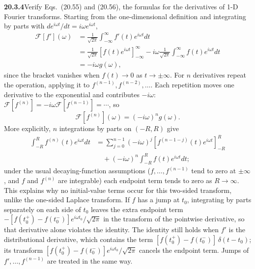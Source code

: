\par\bigskip
\noindent\textbf{20.3.4}\quad Verify Eqs.~(20.55) and (20.56), the
formulas for the derivatives of 1-D Fourier transforms.
\solution
Starting from the one-dimensional definition and integrating by
parts with $de^{i\omega t}/dt=i\omega e^{i\omega t}$,
\begin{align*}
\mathcal F[f'](\omega)
&=\frac1{\sqrt{2\pi}}\int_{-\infty}^{\infty}f'(t)e^{i\omega t}dt\\
&=\frac1{\sqrt{2\pi}}[f(t)e^{i\omega t}]_{-\infty}^{\infty}
-i\omega\frac1{\sqrt{2\pi}}\int_{-\infty}^{\infty}f(t)e^{i\omega t}dt\\
&=-i\omega g(\omega),
\end{align*}
since the bracket vanishes when $f(t)\to0$ as $t\to\pm\infty$.
For $n$ derivatives repeat the operation, applying it to
$f^{(n-1)},f^{(n-2)},\ldots$. Each repetition moves
one derivative to the exponential and contributes $-i\omega$:
$\mathcal F[f^{(n)}]=-i\omega\mathcal F[f^{(n-1)}]=\cdots$, so
\[
\boxed{\mathcal F[f^{(n)}](\omega)=(-i\omega)^n g(\omega)}.
\]
More explicitly, $n$ integrations by parts on $(-R,R)$ give
\begin{align*}
\int_{-R}^{R}f^{(n)}(t)e^{i\omega t}dt
&=\sum_{j=0}^{n-1}(-i\omega)^j
[f^{(n-1-j)}(t)e^{i\omega t}]_{-R}^{R}\\
&\quad+(-i\omega)^n\int_{-R}^{R}f(t)e^{i\omega t}dt;
\end{align*}
under the usual decaying-function assumptions ($f,\ldots,f^{(n-1)}$
tend to zero at $\pm\infty$, and $f$ and $f^{(n)}$ are integrable)
each endpoint term tends to zero
as $R\to\infty$. This explains why no initial-value terms occur
for this two-sided transform, unlike the one-sided Laplace
transform. If $f$ has a jump at $t_0$, integrating by parts
separately on each side of $t_0$ leaves the extra endpoint term
$-[f(t_0^+)-f(t_0^-)]e^{i\omega t_0}/\sqrt{2\pi}$ in the transform
of the pointwise derivative, so that derivative alone violates the
identity. The identity still holds when $f'$ is the distributional
derivative, which contains the term
$[f(t_0^+)-f(t_0^-)]\,\delta(t-t_0)$; its transform
$[f(t_0^+)-f(t_0^-)]e^{i\omega t_0}/\sqrt{2\pi}$ cancels the endpoint
term. Jumps of $f',\ldots,f^{(n-1)}$ are treated in the same way.

